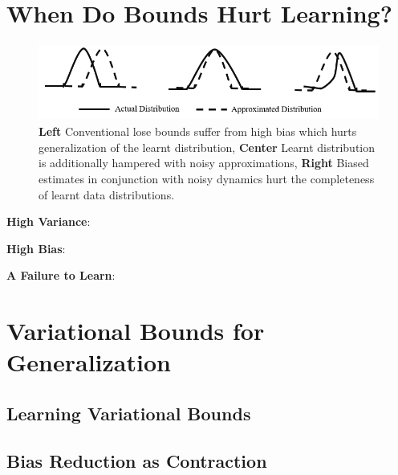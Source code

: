\documentclass{article}
\begin{document}
\section{When Do Bounds Hurt Learning?}
\begin{figure}[ht]
  \centering
  \includegraphics[height=2.5cm,width=13cm]{dist.PNG}
  \caption{\textbf{Left} Conventional lose bounds suffer from high bias which hurts generalization of the learnt distribution, \textbf{Center} Learnt distribution is additionally hampered with noisy approximations, \textbf{Right} Biased estimates in conjunction with noisy dynamics hurt the completeness of learnt data distributions.}
\end{figure}

\textbf{High Variance}:

\textbf{High Bias}: 

\textbf{A Failure to Learn}: 

\section{Variational Bounds for Generalization}

\subsection{Learning Variational Bounds}

\subsection{Bias Reduction as Contraction}
\end{document}
